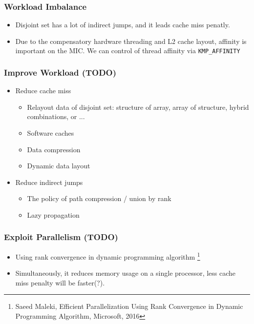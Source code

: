 \begin{frame}
    \begin{figure}[!thb]
      \centering
      \label{fig:cartesianEncoding}
    \end{figure}
\end{frame}

\begin{frame}
	\frametitle{Workload Imbalance}
	\begin{itemize}
		\setlength\itemsep{1em}
		\item Disjoint set has a lot of indirect jumps, and it leads cache miss penatly.
		\item Due to the compensatory hardware threading and L2 cache layout, affinity 
			is important on the MIC. We can control of thread affinity via \tt{KMP\_AFFINITY}
	\end{itemize}
\end{frame}

\begin{frame}
	\frametitle{Improve Workload (TODO)}
	\begin{itemize}
		\setlength\itemsep{1em}
		\item Reduce cache miss
			\begin{itemize}
			 	\item Relayout data of disjoint set: structure of array, 
			 		array of structure, hybrid combinations, or ...
			 	\item Software caches
			 	\item Data compression
			 	\item Dynamic data layout
			\end{itemize}
		\item Reduce indirect jumps
			\begin{itemize}
				\item The policy of path compression / union by rank
				\item Lazy propagation
			\end{itemize}
	\end{itemize}
\end{frame}

\begin{frame}
	\frametitle{Exploit Parallelism (TODO)}
	\begin{itemize}
		\setlength\itemsep{1em}
		\item Using rank convergence in dynamic programming algorithm
			\footnote{Saeed Maleki, Efficient Parallelization Using Rank Convergence in 
				Dynamic Programming Algorithm, Microsoft, 2016}
		\item Simultaneously, it reduces memory usage on a single processor,
			less cache miss penalty will be faster(?).
	\end{itemize}
\end{frame}

